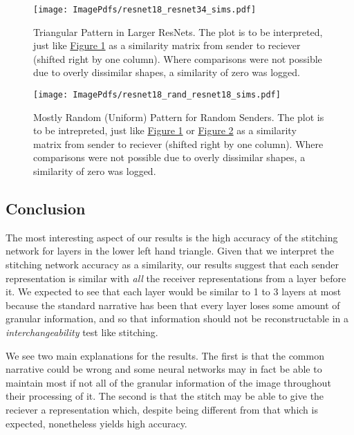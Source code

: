 \documentclass{article} %
\begin{document}
\label{Figure3}
\begin{center}
   \begin{figure}[H]
      \centering
      \texttt{[image: ImagePdfs/resnet18\_resnet34\_sims.pdf]}
      \caption*{Triangular Pattern in Larger ResNets.
      The plot is to be interpreted, just like \hyperref[Figure2]{Figure 1} as a similarity matrix from sender to reciever
      (shifted right by one column).
      Where comparisons were not possible due to overly dissimilar shapes, a similarity of zero was logged.}
   \end{figure}
\end{center}

\label{Figure4}
\begin{center}
   \begin{figure}[H]
      \centering
      \texttt{[image: ImagePdfs/resnet18\_rand\_resnet18\_sims.pdf]}
      \caption*{Mostly Random (Uniform) Pattern for Random Senders. The plot is to be intrepreted, just like
      \hyperref[Figure2]{Figure 1} or \hyperref[Figure3]{Figure 2}
      as a similarity matrix from sender to reciever (shifted right by one column).
      Where comparisons were not possible due to overly dissimilar shapes, a similarity of zero was logged.}
   \end{figure}
\end{center}

\subsection*{Conclusion}
The most interesting aspect of our results is the high accuracy of the stitching network
for layers in the lower left hand triangle. Given that we interpret the stitching network accuracy
as a similarity, our results suggest that each sender representation is similar with \textit{all}
the receiver representations from a layer before it. We expected to see that each layer would be
similar to 1 to 3 layers at most because the standard narrative has been that 
every layer loses some amount of granular information, and so that information should not be reconstructable
in a \textit{interchangeability} test like stitching.

We see two main explanations for the results. The first is that the common narrative could be wrong and some neural
networks may in fact be able to maintain most if not all of the granular information of the image throughout their
processing of it. The second is that the stitch may be able to give the reciever a representation which, despite being
different from that which is expected, nonetheless yields high accuracy.
\end{document}
